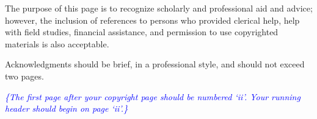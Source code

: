 The purpose of this page is to recognize scholarly and professional aid and advice; however, the inclusion of references to persons who provided clerical help, help with field studies, financial assistance, and permission to use copyrighted materials is also acceptable.

Acknowledgments should be brief, in a professional style, and should not exceed two pages. 

\textit{\textcolor{blue}{\{The first page after your copyright page should be numbered ‘ii’. Your running header should begin on page ‘ii’.\}}}



